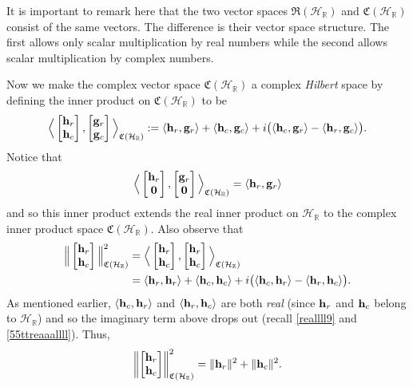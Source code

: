 \documentclass{dis}
\theoremstyle{plain}
\theoremstyle{definition}
\def\R{\mathbb{R}}
\renewcommand{\vec}[1]{{\bf #1}}
\newcommand{\0}{{\color{lightgray}0}}
\begin{document}
It is important to remark here that the two vector spaces $\mathfrak{R}(\mathcal{H}_{\R})$ and $\mathfrak{C}(\mathcal{H}_{\R})$ consist of the same vectors. The difference is their vector space structure. The first allows only scalar multiplication by real numbers while the second allows scalar multiplication by complex numbers. 


Now we make the complex vector space $\mathfrak{C}(\mathcal{H}_{\R})$ a complex {\em Hilbert} space by defining the inner product on  $\mathfrak{C}(\mathcal{H}_{\R})$ to be
$$\Big\langle \begin{bmatrix} \vec{h}_r\\ \vec{h}_c \end{bmatrix}, \begin{bmatrix} \vec{g}_r\\\vec{g}_c\end{bmatrix} \Big\rangle_{\mathfrak{C}(\mathcal{H}_{\R})} := \langle \vec{h}_r, \vec{g}_r\rangle  + \langle \vec{h}_c, \vec{g}_c\rangle + i \big(\langle \vec{h}_c, \vec{g}_r\rangle - \langle \vec{h}_r, \vec{g}_c\rangle\big).$$
Notice that
$$\Big\langle \begin{bmatrix}\vec{h}_r\\ \vec{0}\end{bmatrix}, \begin{bmatrix} \vec{g}_r\\ \vec{0}\end{bmatrix}\Big\rangle_{\mathfrak{C}(\mathcal{H}_{\R})} = \langle \vec{h}_r, \vec{g}_r\rangle$$
and so this inner product extends the real inner product on $\mathcal{H}_{\R}$ to the complex inner product space $\mathfrak{C}(\mathcal{H}_{\R})$. Also observe that
\begin{align*}
\Big\|\begin{bmatrix} \vec{h}_r\\   \vec{h}_c\end{bmatrix}\Big\|_{\mathfrak{C}(\mathcal{H}_{\R})}^2 & = \Big\langle \begin{bmatrix}\vec{h}_r\\  \vec{h}_c\end{bmatrix}, \begin{bmatrix} \vec{h}_r\\\vec{h}_c\end{bmatrix}\Big\rangle_{\mathfrak{C}(\mathcal{H}_{\R})}\\
& = \langle \vec{h}_r, \vec{h}_r\rangle + \langle \vec{h}_c, \vec{h}_c\rangle + i \big(\langle \vec{h}_c, \vec{h}_r\rangle - \langle \vec{h}_r, \vec{h}_c\rangle\big).
\end{align*}
As mentioned earlier, $\langle \vec{h}_c, \vec{h}_r\rangle$ and $ \langle \vec{h}_r, \vec{h}_c\rangle$ are both {\em real} (since $\vec{h}_r$ and $\vec{h}_c$ belong to $\mathcal{H}_{\R}$) and so  the imaginary term above drops   out (recall \eqref{reallll9} and \eqref{55ttreaaallll}). Thus,
$$\left\|\begin{bmatrix}\vec{h}_r\\   \vec{h}_c\end{bmatrix}\right\|_{\mathfrak{C}(\mathcal{H}_{\R})}^2 = \|\vec{h}_r\|^2 + \|\vec{h}_{c}\|^2.$$
\end{document}
